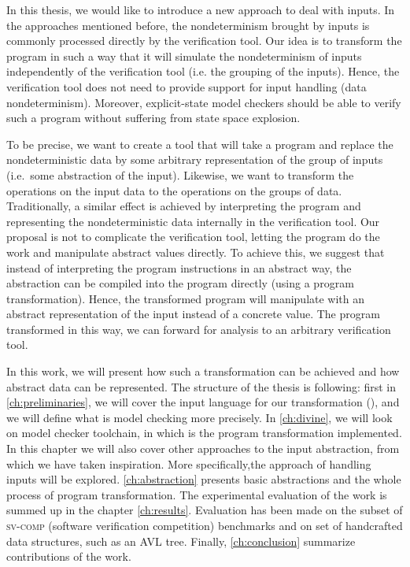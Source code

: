 In this thesis, we would like to introduce a new approach to deal with inputs.
In the approaches mentioned before, the nondeterminism brought by inputs is
commonly processed directly by the verification tool. Our idea is to transform
the program in such a way that it will simulate the nondeterminism of inputs
independently of the verification tool (i.e. the grouping of the inputs). Hence,
the verification tool does not need to provide support for input handling (data
nondeterminism). Moreover, explicit-state model checkers should be able
to verify such a program without suffering from state space explosion.

To be precise, we want to create a tool that will take a program and replace the
nondeterministic data by some arbitrary representation of the group of inputs
(i.e.~some abstraction of the input).  Likewise, we want to transform the
operations on the input data to the operations on the groups of
data. Traditionally, a similar
effect is achieved by interpreting the program and representing the
nondeterministic data internally in the verification tool. Our proposal is
not to complicate the verification tool, letting the program do the work and
manipulate abstract values directly. To achieve this, we suggest that
instead of interpreting the program instructions in an abstract way, the
abstraction can be compiled into the program directly (using a program
transformation). Hence, the transformed program will manipulate with
an abstract representation of the input instead of a concrete value.
The program transformed in this way, we can forward for analysis to
an arbitrary verification tool.

In this work, we will present how such a transformation can be achieved and how
 abstract data can be represented. The structure of the thesis is following:
first in \autoref{ch:preliminaries}, we will cover the input language for our
transformation (\LLVM), and we will define what is model checking more
precisely. In \autoref{ch:divine}, we will look on \DIVINE model checker
toolchain, in which is the program transformation implemented. In this chapter
we will also cover other approaches to the input abstraction, from which we
have taken inspiration. More specifically,the \SymDIVINE approach of handling
inputs will be explored. \autoref{ch:abstraction} presents basic abstractions
and the whole process of program transformation. The experimental evaluation of
the work is summed up in the chapter \autoref{ch:results}.  Evaluation has been
made on the subset of \textsc{sv-comp} (software verification competition)
benchmarks and on set of handcrafted data structures, such as an AVL tree.
Finally, \autoref{ch:conclusion} summarize contributions of the work.

